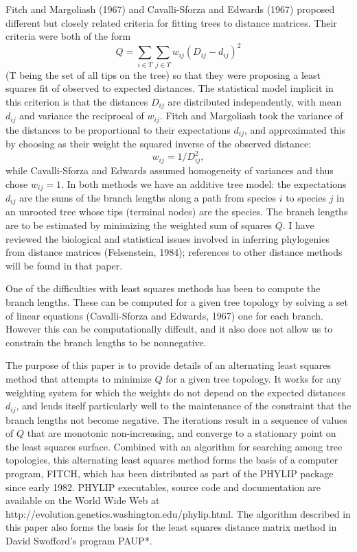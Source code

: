 \documentclass[12pt]{article}
\begin{document}
Fitch and Margoliash (1967) and Cavalli-Sforza and Edwards (1967) proposed
different but closely related criteria for fitting trees to distance
matrices.  Their criteria were both of the form
\begin{equation}
      Q   =   \sum_{i\in T}   \sum_{j\in T}   w_{ij} (D_{ij}  -  d_{ij})^2
\end{equation}
(T being the set of all tips on the tree)
so that they were proposing a least squares fit of observed to expected
distances.  The statistical model implicit in this criterion is that the
distances $D_{ij}$ are distributed independently, with mean $d_{ij}$ and
variance the reciprocal of $w_{ij}$.  Fitch and Margoliash took the variance
of the distances to be proportional to their expectations $d_{ij}$, and 
approximated this by
choosing as their weight the squared inverse of the observed distance:
\begin{equation}
      w_{ij}   =   1 / D_{ij}^2,
\end{equation}
while Cavalli-Sforza and Edwards assumed homogeneity of variances and thus 
chose $w_{ij} = 1$.  In both methods we have an additive tree model: the 
expectations $d_{ij}$ are the sums of the
branch lengths along a path from species $i$ to species $j$ in an unrooted tree
whose tips (terminal nodes) are the species.  The branch lengths are to be 
estimated by minimizing the weighted sum of squares $Q$.  I have
reviewed the biological and statistical issues involved in inferring 
phylogenies from distance matrices (Felsenstein, 1984); references to other 
distance methods will be found in that paper.

One of the difficulties with least squares methods has been to compute the
branch lengths.  These can be computed for a given tree topology
by solving a set of linear equations (Cavalli-Sforza and Edwards, 1967)
one for each branch.  However this can be computationally diffcult, and it
also does not allow us to constrain the branch lengths to be nonnegative.

The purpose of this paper is to provide details of an alternating least
squares method that attempts to minimize $Q$ for a given tree topology.  It 
works for any weighting
system for which the weights do not depend on the expected distances
$d_{ij}$, and lends itself particularly well to the maintenance of the constraint
that the branch lengths not become negative.  The iterations result in a
sequence of values of $Q$ that are monotonic non-increasing, and converge to a
stationary point on the least squares surface.  Combined with an algorithm 
for searching among tree topologies, this alternating least squares method
forms the basis of a computer program, FITCH, which has been distributed as
part of the PHYLIP package since early 1982.  PHYLIP executables, source code
and documentation are available on the World Wide Web at
http://evolution.genetics.washington.edu/phylip.html.  The algorithm described
in this paper also forms the basis for the least squares distance matrix
method in David Swofford's program PAUP*.
\end{document}
